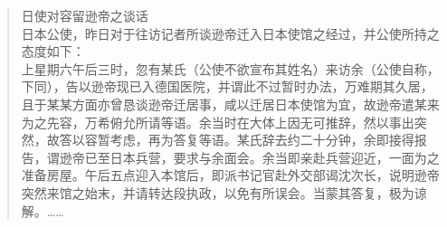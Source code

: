 \begin{quote}
	日使对容留逊帝之谈话\\

日本公使，昨日对于往访记者所谈逊帝迁入日本使馆之经过，并公使所持之态度如下：\\

上星期六午后三时，忽有某氏（公使不欲宣布其姓名）来访余（公使自称，下同），告以逊帝现已入德国医院，并谓此不过暂时办法，万难期其久居，且于某某方面亦曾恳谈逊帝迁居事，咸以迁居日本使馆为宜，故逊帝遣某来为之先容，万希俯允所请等语。余当时在大体上因无可推辞，然以事出突然，故答以容暂考虑，再为答复等语。某氏辞去约二十分钟，余即接得报告，谓逊帝已至日本兵营，要求与余面会。余当即亲赴兵营迎近，一面为之准备房屋。午后五点迎入本馆后，即派书记官赴外交部谒沈次长，说明逊帝突然来馆之始末，并请转达段执政，以免有所误会。当蒙其答复，极为谅解。……\\
\end{quote}
